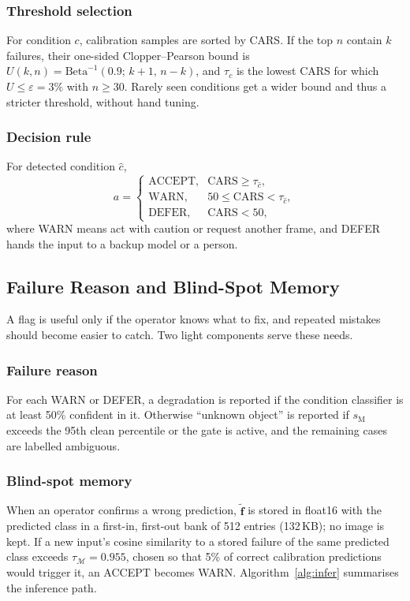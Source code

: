 \documentclass[conference]{IEEEtran}
\begin{document}
\subsubsection{Threshold selection}
For condition $c$, calibration samples are sorted by CARS. If the top $n$ contain $k$ failures, their one-sided Clopper--Pearson bound \cite{clopper1934binomial} is $U(k,n)=\mathrm{Beta}^{-1}(0.9;\,k+1,\,n-k)$, and $\tau_c$ is the lowest CARS for which $U\le\varepsilon=3\%$ with $n\ge30$. Rarely seen conditions get a wider bound and thus a stricter threshold, without hand tuning.

\subsubsection{Decision rule}
For detected condition $\hat{c}$,
\begin{equation}
a=\begin{cases}
\text{ACCEPT}, & \text{CARS}\ge\tau_{\hat{c}},\\
\text{WARN}, & 50\le\text{CARS}<\tau_{\hat{c}},\\
\text{DEFER}, & \text{CARS}<50,
\end{cases}
\label{eq:decision}
\end{equation}
where WARN means act with caution or request another frame, and DEFER hands the input to a backup model or a person.

\subsection{Failure Reason and Blind-Spot Memory}

A flag is useful only if the operator knows what to fix, and repeated mistakes should become easier to catch. Two light components serve these needs.

\subsubsection{Failure reason}
For each WARN or DEFER, a degradation is reported if the condition classifier is at least 50\% confident in it. Otherwise ``unknown object'' is reported if $s_{\text{M}}$ exceeds the 95th clean percentile or the gate is active, and the remaining cases are labelled ambiguous.

\subsubsection{Blind-spot memory}
When an operator confirms a wrong prediction, $\tilde{\mathbf{f}}$ is stored in float16 with the predicted class in a first-in, first-out bank of 512 entries (132\,KB); no image is kept. If a new input's cosine similarity to a stored failure of the same predicted class exceeds $\tau_{\mathcal{M}}=0.955$, chosen so that 5\% of correct calibration predictions would trigger it, an ACCEPT becomes WARN. Algorithm~\ref{alg:infer} summarises the inference path.
\end{document}
